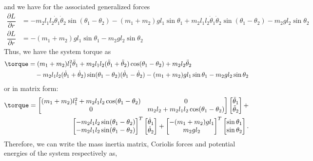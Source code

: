and we have for the associated generalized forces
%
\begin{align}
\dfrac{\partial L}{\partial r} &=   - m_2 l_1 l_2  \dot{\theta}_1\dot{\theta}_2 \sin(\theta_1 - \theta_2) - (m_1+m_2)g l_1 \sin \theta_1  + m_2 l_1 l_2  \dot{\theta}_1\dot{\theta}_2 \sin(\theta_1 - \theta_2)  - m_2 g l_2 \sin \theta_2 \nonumber \\
%
\dfrac{\partial L}{\partial r} &= - (m_1+m_2)g l_1 \sin \theta_1- m_2 g l_2 \sin \theta_2
\end{align}
%
Thus, we have the system torque as 
%
\begin{align}
	\torque &= (m_1+m_2)l_1^2 \ddot{\theta}_1 + m_2 l_1 l_2 (\ddot{\theta}_1 + \ddot{\theta}_2) \cos(\theta_1 - \theta_2)  + m_2 l_2 \ddot{\theta}_2  \nonumber \\
	& \quad-  m_2 l_1 l_2(\dot{\theta}_1 + \dot{\theta}_2) \sin(\theta_1 - \theta_2) (\dot{\theta}_1 - \dot{\theta}_2) - (m_1+m_2)g l_1 \sin \theta_1- m_2 g l_2 \sin \theta_2
\end{align}
%
or in matrix form:
%
\begin{align}
	\torque = 
	\begin{bmatrix}
	(m_1+m_2)l_1^2  + m_2 l_1 l_2 \cos(\theta_1 - \theta_2) &  0 \\
	0 & m_2 l_2 + m_2 l_1 l_2 \cos(\theta_1 - \theta_2) 
	\end{bmatrix}
	\begin{bmatrix}
	\ddot{\theta}_1 \\ \ddot{\theta}_2
	\end{bmatrix} + \nonumber \\
	\begin{bmatrix}
	-  m_2 l_1 l_2 \sin(\theta_1 - \theta_2) \\
	-  m_2 l_1 l_2 \sin(\theta_1 - \theta_2)
	\end{bmatrix}^T
	\begin{bmatrix}
	\dot{\theta}_1 \\ \dot{\theta}_2
	\end{bmatrix} 
	+
	\begin{bmatrix}
	- (m_1+m_2)g l_1  \\
	m_2 g l_2 
	\end{bmatrix}^T
	\begin{bmatrix}
		\sin \theta_1 \\
		 \sin \theta_2
	\end{bmatrix}.
\end{align}
%
Therefore, we can write the mass inertia matrix, Coriolis forces and potential energies of the system respectively as, 
